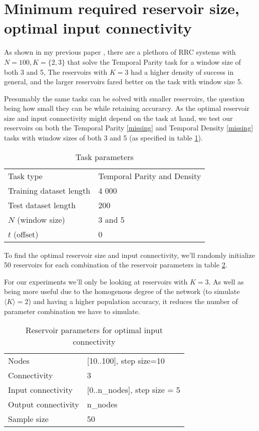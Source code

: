 \section{Minimum required reservoir size, optimal input connectivity}

As shown in my previous paper \cite{MyPreviousPaper},
there are a plethora of RRC systems with $N=100, K=\{2, 3\}$ that solve the Temporal Parity task for a window size of both 3 and 5,
The reservoirs with $K=3$ had a higher density of success in general,
and the larger reservoirs fared better on the task with window size 5.

Presumably the same tasks can be solved with smaller reservoirs,
the question being how small they can be while retaining accurarcy.
As the optimal reservoir size and input connectivity might depend on the task at hand,
we test our reservoirs on both the Temporal Parity \ref{missing} and Temporal Density \ref{missing}
tasks with window sizes of both 3 and 5 (as specified in table \ref{tab:tasks}).

\begin{table}[ht]
  \centering
  \caption{Task parameters}
  \label{tab:tasks}
  \begin{tabular}{ll}
    Task type               & Temporal Parity and Density \\
    Training dataset length & 4 000                       \\
    Test dataset length     & 200                         \\
    $N$ (window size)       & 3 and 5                     \\
    $t$ (offset)            & 0
  \end{tabular}
\end{table}

To find the optimal reservoir size and input connectivity,
we'll randomly initialize 50 reservoirs for each combination of the reservoir parameters in table \ref{tab:ic-reservoir-parameters}.

For our experiments we'll only be looking at reservoirs with $K=3$.
As well as being more useful due to the homogenous degree of the network (to simulate $\langle K \rangle = 2 $) and
having a higher population accuracy, it reduces the number of parameter combination we have to simulate.

\begin{table}[ht]
    \centering
    \caption{Reservoir parameters for optimal input connectivity}
    \label{tab:ic-reservoir-parameters}
    \begin{tabular}{ll}
        Nodes               & [10..100], step size=10       \\
        Connectivity        & 3                             \\
        Input connectivity  & [0..n\_nodes], step size = 5  \\
		Output connectivity & n\_nodes                      \\
        Sample size         & 50
    \end{tabular}
\end{table}

